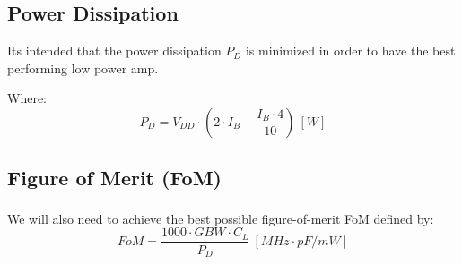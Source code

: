 \subsection{Power Dissipation}

Its intended that the power dissipation $P_D$ is minimized in order to have the best performing low power amp.

Where: 
\begin{equation}
    P_D = V_{DD} \cdot \left(2 \cdot I_B + \dfrac{I_B\cdot 4}{10}\right) \ [W]
    \label{eq:PD}
\end{equation}

\subsection{Figure of Merit (FoM)}
 We will also need to achieve the best possible figure-of-merit FoM defined by\textsuperscript{\cite{Lab-statement}}: 
\begin{equation}
    FoM = \frac{1000 \cdot GBW \cdot C_L}{P_D} \ [MHz \cdot pF/mW]
    \label{eq:FoM}
\end{equation}
